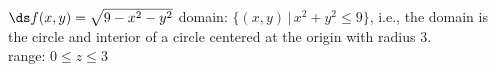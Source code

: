 {$\ds f(x,y) = \sqrt{9-x^2-y^2}$}
{domain: $\{(x,y)\,|\, x^2+y^2\leq 9\}$, i.e., the domain is the circle and interior of a circle centered at the origin with radius 3.\\
range: $0\leq z\leq 3$}